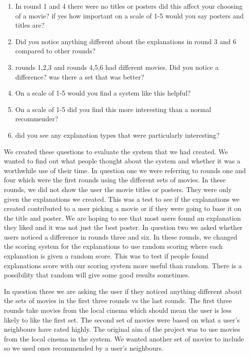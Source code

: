             \begin{enumerate}
                \item In round 1 and 4 there were no titles or posters did this affect your choosing of a movie? if yes how important on a scale of 1-5 would you say posters and titles are?
                \item Did you notice anything different about the explanations in round 3 and 6 compared to other rounds?
                \item rounds 1,2,3 and rounds 4,5,6 had different movies. Did you notice a difference? was there a set that was better?
                \item On a scale of 1-5 would you find a system like this helpful?
                \item On a scale of 1-5 did you find this more interesting than a normal recommender?
                \item did you see any explanation types that were particularly interesting?
            \end{enumerate}

            We created these questions to evaluate the system that we had created. We wanted to find out what people thought about the system and whether it was a worthwhile use of their time. In question one we were referring to rounds one and four which were the first rounds using the different sets of movies. In these rounds, we did not show the user the movie titles or posters. They were only given the explanations we created. This was a test to see if the explanations we created contributed to a user picking a movie or if they were going to base it on the title and poster. We are hoping to see that most users found an explanation they liked and it was not just the best poster.
            In question two we asked whether users noticed a difference in rounds three and six. In these rounds, we changed the scoring system for the explanations to use random scoring where each explanation is given a random score. This was to test if people found explanations score with our scoring system more useful than random. There is a possibility that random will give some good results sometimes. 

            In question three we are asking the user if they noticed anything different about the sets of movies in the first three rounds vs the last rounds. The first three rounds take movies from the local cinema which should mean the user is  less likely to like the first set. The second set of movies were based on what a user's neighbours have rated highly. The original aim of the project was to use movies from the local cinema in the system. We wanted another set of movies to include so we used ones recommended by a user's neighbours.

